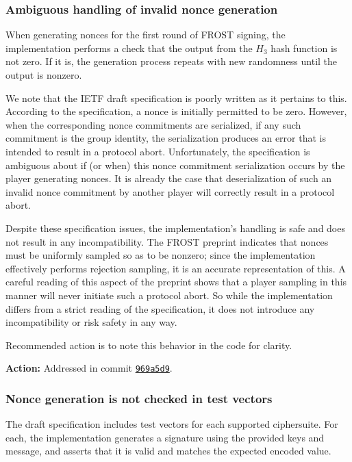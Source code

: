\documentclass{article}
\begin{document}
\subsubsection{Ambiguous handling of invalid nonce generation}

When generating nonces for the first round of FROST signing, the implementation performs a check that the output from the $H_3$ hash function is not zero.
If it is, the generation process repeats with new randomness until the output is nonzero.

We note that the IETF draft specification is poorly written as it pertains to this.
According to the specification, a nonce is initially permitted to be zero.
However, when the corresponding nonce commitments are serialized, if any such commitment is the group identity, the serialization produces an error that is intended to result in a protocol abort.
Unfortunately, the specification is ambiguous about if (or when) this nonce commitment serialization occurs by the player generating nonces.
It is already the case that deserialization of such an invalid nonce commitment by another player will correctly result in a protocol abort.

Despite these specification issues, the implementation's handling is safe and does not result in any incompatibility.
The FROST preprint indicates that nonces must be uniformly sampled so as to be nonzero; since the implementation effectively performs rejection sampling, it is an accurate representation of this.
A careful reading of this aspect of the preprint shows that a player sampling in this manner will never initiate such a protocol abort.
So while the implementation differs from a strict reading of the specification, it does not introduce any incompatibility or risk safety in any way.

Recommended action is to note this behavior in the code for clarity.

\textbf{Action:} Addressed in commit \href{https://github.com/serai-dex/serai/commit/969a5d94f2516245a77245cf815f3351cd991b02}{\texttt{969a5d9}}.


\subsubsection{Nonce generation is not checked in test vectors}

The draft specification includes test vectors for each supported ciphersuite.
For each, the implementation generates a signature using the provided keys and message, and asserts that it is valid and matches the expected encoded value.
\end{document}
